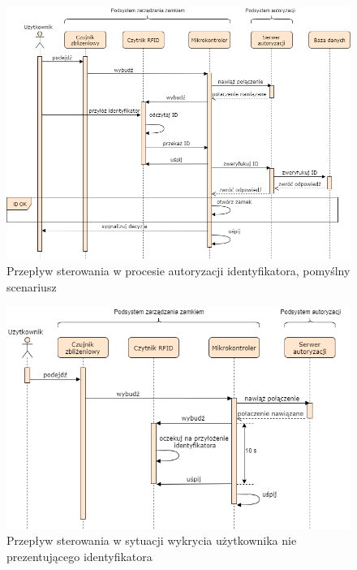             \begin{figure}[]
                \includegraphics[width=\linewidth]{chapters/images/sequence1.png}
                \caption{Przepływ sterowania w procesie autoryzacji identyfikatora, pomyślny scenariusz}
                \label{fig:sequence1}
            \end{figure}

            \begin{figure}[]
                \includegraphics[width=\linewidth]{chapters/images/sequence2.png}
                \caption{Przepływ sterowania w sytuacji wykrycia użytkownika nie prezentującego identyfikatora}
                \label{fig:sequence2}
            \end{figure}

